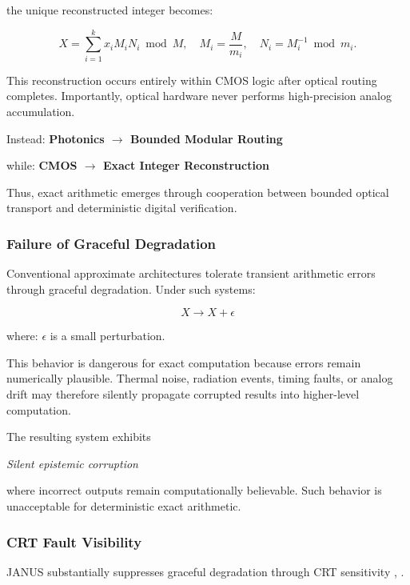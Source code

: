 \documentclass[journal]{IEEEtran}
\begin{document}
the unique reconstructed integer becomes:

\begin{equation}
X = \sum_{i=1}^k x_i M_i N_i \bmod M, \quad M_i = \frac{M}{m_i}, \quad N_i = M_i^{-1} \bmod m_i.
\end{equation}

This reconstruction occurs entirely within CMOS logic after optical routing completes. Importantly, optical hardware never performs high-precision analog accumulation.

Instead:
\textbf{Photonics $\rightarrow$ Bounded Modular Routing}

while:
\textbf{CMOS $\rightarrow$ Exact Integer Reconstruction}

Thus, exact arithmetic emerges through cooperation between bounded optical transport and deterministic digital verification.

\subsubsection{\textbf{Failure of Graceful Degradation}}

Conventional approximate architectures tolerate transient arithmetic errors through graceful degradation. Under such systems:

\begin{equation}
X \rightarrow X + \epsilon
\end{equation}

where: $\epsilon$ is a small perturbation.

This behavior is dangerous for exact computation because errors remain numerically plausible. Thermal noise, radiation events, timing faults, or analog drift may therefore silently propagate corrupted results into higher-level computation.

The resulting system exhibits 

\textit{Silent epistemic corruption}

where incorrect outputs remain computationally believable. Such behavior is unacceptable for deterministic exact arithmetic.

\subsubsection{\textbf{CRT Fault Visibility}}

JANUS substantially suppresses graceful degradation through CRT sensitivity \cite{Xia2000}, \cite{Barsi1973,Yang2002}.
\end{document}

